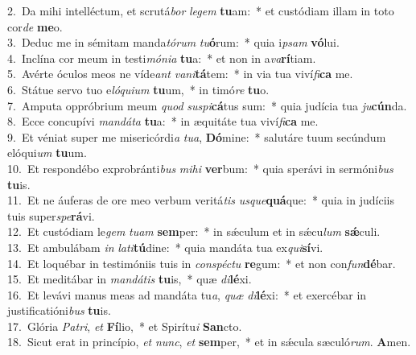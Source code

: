 {2.~}Da mihi intelléctum, et scrutá\textit{bor} \textit{le}\textit{gem} \textbf{tu}am:~* et custódiam illam in toto cor\textit{de} \textbf{me}o.\\
{3.~}Deduc me in sémitam manda\textit{tó}\textit{rum} \textit{tu}\textbf{ó}rum:~* quia i\textit{psam} \textbf{vó}lui.\\
{4.~}Inclína cor meum in testi\textit{mó}\textit{ni}\textit{a} \textbf{tu}a:~* et non in a\textit{va}\textbf{rí}tiam.\\
{5.~}Avérte óculos meos ne víde\textit{ant} \textit{va}\textit{ni}\textbf{tá}tem:~* in via tua viví\textit{fi}\textbf{ca} me.\\
{6.~}Státue servo tuo e\textit{ló}\textit{qui}\textit{um} \textbf{tu}um,~* in timó\textit{re} \textbf{tu}o.\\
{7.~}Amputa oppróbrium meum \textit{quod} \textit{su}\textit{spi}\textbf{cá}tus sum:~* quia judícia tua \textit{ju}\textbf{cún}da.\\
{8.~}Ecce concupívi \textit{man}\textit{dá}\textit{ta} \textbf{tu}a:~* in æquitáte tua viví\textit{fi}\textbf{ca} me.\\
{9.~}Et véniat super me misericórdi\textit{a} \textit{tu}\textit{a}, \textbf{Dó}mine:~* salutáre tuum secúndum elóqui\textit{um} \textbf{tu}um.\\
{10.~}Et respondébo exprobránti\textit{bus} \textit{mi}\textit{hi} \textbf{ver}bum:~* quia sperávi in sermóni\textit{bus} \textbf{tu}is.\\
{11.~}Et ne áuferas de ore meo verbum veritá\textit{tis} \textit{us}\textit{que}\textbf{quá}que:~* quia in judíciis tuis super\textit{spe}\textbf{rá}vi.\\
{12.~}Et custódiam le\textit{gem} \textit{tu}\textit{am} \textbf{sem}per:~* in sǽculum et in sǽcu\textit{lum} \textbf{sǽ}culi.\\
{13.~}Et ambulábam \textit{in} \textit{la}\textit{ti}\textbf{tú}dine:~* quia mandáta tua ex\textit{qui}\textbf{sí}vi.\\
{14.~}Et loquébar in testimóniis tuis in \textit{con}\textit{spé}\textit{ctu} \textbf{re}gum:~* et non con\textit{fun}\textbf{dé}bar.\\
{15.~}Et meditábar in \textit{man}\textit{dá}\textit{tis} \textbf{tu}is,~* quæ \textit{di}\textbf{lé}xi.\\
{16.~}Et levávi manus meas ad mandáta tu\textit{a}, \textit{quæ} \textit{di}\textbf{lé}xi:~* et exercébar in justificatióni\textit{bus} \textbf{tu}is.\\
{17.~}Glória \textit{Pa}\textit{tri}, \textit{et} \textbf{Fí}lio,~* et Spirítu\textit{i} \textbf{San}cto.\\
{18.~}Sicut erat in princípio, \textit{et} \textit{nunc}, \textit{et} \textbf{sem}per,~* et in sǽcula sæculó\textit{rum}. \textbf{A}men.\\
